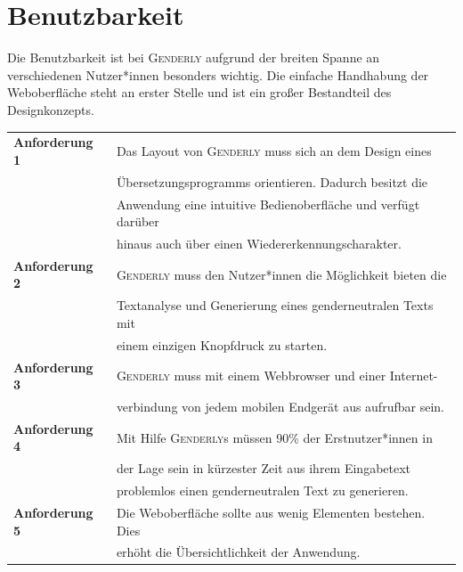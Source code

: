 \documentclass[paper=a4, parskip=half]{scrreprt}
\newcommand{\Genderly}{\textsc{Genderly}}
\begin{document}
\section{Benutzbarkeit}
Die Benutzbarkeit ist bei \Genderly{} aufgrund der breiten Spanne an verschiedenen Nutzer*innen besonders wichtig.
Die einfache Handhabung der Weboberfläche steht an erster Stelle und ist ein großer Bestandteil des Designkonzepts.
\begin{table}[!htb]
\begin{tabular}{ll}
\textbf{Anforderung 1} & Das Layout von \Genderly{} muss sich an dem Design eines \\
& Übersetzungsprogramms orientieren. Dadurch besitzt die \\
& Anwendung eine intuitive Bedienoberfläche und verfügt darüber \\
& hinaus auch über einen Wiedererkennungscharakter. \vspace{0.15cm}\\ 
\textbf{Anforderung 2} & \Genderly{} muss den Nutzer*innen die Möglichkeit bieten die \\
& Textanalyse und Generierung eines genderneutralen Texts mit \\
& einem einzigen Knopfdruck zu starten. \vspace{0.15cm}\\ 
\textbf{Anforderung 3} & \Genderly{} muss mit einem Webbrowser und einer Internet- \\
& verbindung von jedem mobilen Endgerät aus aufrufbar sein. \vspace{0.15cm}\\ 
\textbf{Anforderung 4} & Mit Hilfe \Genderly{}s müssen 90\% der Erstnutzer*innen in \\
& der Lage sein in kürzester Zeit aus ihrem Eingabetext \\
& problemlos einen genderneutralen Text zu generieren. \vspace{0.15cm}\\
\textbf{Anforderung 5} & Die Weboberfläche sollte aus wenig Elementen bestehen. Dies \\
& erhöht die Übersichtlichkeit der Anwendung. \vspace{0.15cm}\\
\end{tabular}
\end{table}
\end{document}
